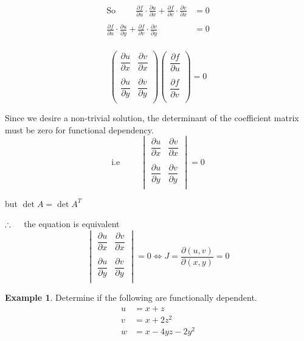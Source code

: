 \documentclass[11pt,a4paper]{article}
\theoremstyle{definition}
\newtheorem{exa}[thm]{Example}
\begin{document}
\begin{align*}
\text{So}\hspace{1cm} \frac{\partial f}{\partial u}\cdot \frac{\partial u}{\partial x} + \frac{\partial f}{\partial v}\cdot \frac{\partial v}{\partial x} & = 0\\\\
\frac{\partial f}{\partial u}\cdot \frac{\partial u}{\partial y} +  \frac{\partial f}{\partial v}\cdot \frac{\partial v}{\partial y} & = 0\\
\end{align*}

$$\begin{pmatrix}
\dfrac{\partial u}{\partial x} & \dfrac{\partial v}{\partial x}\\\\
\dfrac{\partial u}{\partial y} & \dfrac{\partial v}{\partial y}\\
\end{pmatrix}
\begin{pmatrix}
\dfrac{\partial f}{\partial u}\\\\
\dfrac{\partial f}{\partial v}\\
\end{pmatrix}
 = 0
$$

Since we desire a non-trivial solution, the determinant of the coefficient matrix must be zero for functional dependency.
$$\text{i.e}\hspace{1cm}
\begin{vmatrix}
\dfrac{\partial u}{\partial x} & \dfrac{\partial v}{\partial x}\\\\
\dfrac{\partial u}{\partial y} & \dfrac{\partial v}{\partial y}\\
\end{vmatrix} = 0$$

but $\det A = \det A^T$


$\therefore\hspace{0.4cm}$ the equation is equivalent 
$$
\begin{vmatrix}
\dfrac{\partial u}{\partial x} & \dfrac{\partial v}{\partial x}\\\\
\dfrac{\partial u}{\partial y} & \dfrac{\partial v}{\partial y}\\
\end{vmatrix} = 0 \iff J = \frac{\partial (u,v)}{\partial (x,y)} = 0
$$


\begin{exa}


Determine if the following  are functionally dependent.
\begin{align*}
u & =  x  +  z\\
v & =  x  +  2z^2\\
w & =  x  -  4yz - 2y^2\\
\end{align*}
\end{exa}
\end{document}
